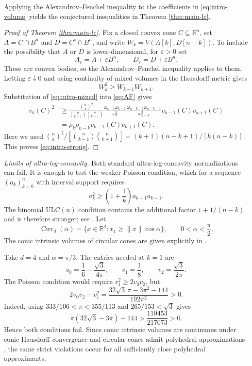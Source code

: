 \documentclass[12pt,a4paper]{article}
\numberwithin{equation}{section}
\theoremstyle{definition}
\theoremstyle{remark}
\newcommand{\R}{\mathbb{R}}
\begin{document}
Applying the Alexandrov--Fenchel inequality to the coefficients in \eqref{eq:intro-volume} yields the conjectured inequalities in Theorem \ref{thm:main-lc}.
\begin{proof}[Proof of Theorem \ref{thm:main-lc}]
Fix a closed convex cone $C\subseteq\R^n$, set
$A=C\cap B^n$ and $D=C^\circ\cap B^n$, and write
$W_k=V(A[k],D[n-k])$.  To include the possibility that $A$ or $D$ is
lower-dimensional, for $\varepsilon>0$ set
\[
 A_\varepsilon=A+\varepsilon B^n,
 \qquad D_\varepsilon=D+\varepsilon B^n.
\]
These are convex bodies, so the Alexandrov--Fenchel inequality applies
to them.  Letting $\varepsilon\downarrow0$ and using continuity of
mixed volumes in the Hausdorff metric
\cite[Section~5.1]{SchneiderConvexBodies} gives
\begin{equation}\label{eq:AF}
 W_k^2\ge W_{k-1}W_{k+1}.
\end{equation}
Substitution of \eqref{eq:intro-mixed} into \eqref{eq:AF} gives
\begin{align*}
 v_k(C)^2
 &\ge
 \frac{\binom nk^2}
 {\binom n{k-1}\binom n{k+1}}
 \frac{\omega_{k-1}\omega_{k+1}}{\omega_k^2}
 \frac{\omega_{n-k-1}\omega_{n-k+1}}
      {\omega_{n-k}^2}
 v_{k-1}(C)v_{k+1}(C)\\
 &=\rho_k\rho_{n-k}
 v_{k-1}(C)v_{k+1}(C).
\end{align*}
Here we used
$\binom nk^2/[\binom n{k-1}\binom n{k+1}]
=(k+1)(n-k+1)/[k(n-k)]$.
This proves \eqref{eq:intro-strong}.
\end{proof}

\medskip
\noindent\emph{Limits of ultra-log-concavity.}
Both standard ultra-log-concavity normalizations can fail.  It is
enough to test the weaker Poisson condition, which for a sequence
$(a_k)_{k=0}^n$ with interval support requires
\[
 a_k^2\ge
 \left(1+\frac1k\right)a_{k-1}a_{k+1}.
\]
The binomial ULC$(n)$ condition contains the additional factor
$1+1/(n-k)$ and is therefore stronger; see
\cite{MarsigliettiMelbourne}.  Let
\[
 \operatorname{Circ}_d(\alpha)
 =\{x\in\R^d:x_1\ge\|x\|\cos\alpha\},
 \qquad 0<\alpha<\frac\pi2.
\]
The conic intrinsic volumes of circular cones are given explicitly in
\cite[Appendix~D.1]{ALMT}.

Take $d=4$ and $\alpha=\pi/3$.  The entries needed at $k=1$ are
\[
 v_0=\frac16-\frac{\sqrt3}{4\pi},
 \qquad
 v_1=\frac18,
 \qquad
 v_2=\frac{\sqrt3}{2\pi}.
\]
The Poisson condition would require $v_1^2\ge2v_0v_2$, but
\[
 2v_0v_2-v_1^2
 =\frac{32\sqrt3\,\pi-3\pi^2-144}{192\pi^2}>0.
\]
Indeed, using $333/106<\pi<355/113$ and $265/153<\sqrt3$ gives
\[
 \pi(32\sqrt3-3\pi)-144
 >\frac{110453}{217073}>0.
\]
Hence both conditions fail.  Since conic intrinsic volumes are
continuous under conic Hausdorff convergence and circular cones admit
polyhedral approximations
\cite[Fact~7.4 and Proposition~8.2]{McCoyTropp}, the same strict violations occur
for all sufficiently close polyhedral approximants.
\end{document}
